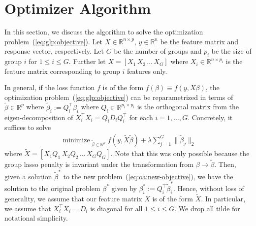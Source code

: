\documentclass[fontsize=11pt]{article}
\newcommand{\br}[1]{\left[#1\right]}
\newcommand{\R}{\mathbb{R}}
\newcommand{\norm}[1]{\|#1\|}
\DeclareMathOperator*{\minimize}{minimize\;}
\begin{document}
\section{Optimizer Algorithm}

In this section, we discuss the algorithm to solve the optimization problem~(\ref{eq:glp:objective}).
Let $X \in \R^{n\times p}$, $y\in \R^n$ be the feature matrix and response vector, respectively.
Let $G$ be the number of groups and $p_i$ be the size of group $i$ for $1\leq i\leq G$.
Further let $X = \br{X_1 \, X_2 \, \ldots \, X_G}$ where $X_i \in \R^{n \times p_i}$ is the feature matrix
corresponding to group $i$ features only.

In general, if the loss function $f$ is of the form $f(\beta) \equiv f(y, X\beta)$,
the optimization problem~(\ref{eq:glp:objective}) can be reparametrized
in terms of $\tilde{\beta} \in \R^p$ where $\tilde{\beta}_i := Q_i^\top \beta_i$
where $Q_i \in \R^{p_i \times p_i}$ is the orthogonal matrix from the eigen-decomposition of 
$X_i^\top X_i = Q_i D_i Q_i^\top$ for each $i=1,\ldots, G$.
Concretely, it suffices to solve
\begin{align}
    \minimize_{\tilde{\beta} \in \R^p}
    f(y, \tilde{X} \tilde{\beta})
    + \lambda \sum\limits_{j=1}^G \norm{\tilde{\beta}_j}_2
    \label{eq:oa:new-objective}
\end{align}
where $\tilde{X} = \br{X_1 Q_1 \, X_2 Q_2 \, \ldots \, X_G Q_G}$.
Note that this was only possible because the group lasso penalty is invariant under
the transformation from $\beta \to \tilde{\beta}$.
Then, given a solution $\tilde{\beta}^*$ to the new problem~(\ref{eq:oa:new-objective}),
we have the solution to the original problem $\beta^*$ given by
$\beta^*_i := Q_i^\top \tilde{\beta}_i^*$.
Hence, without loss of generality, we assume that 
our feature matrix $X$ is of the form $\tilde{X}$.
In particular, we assume that $X_i^\top X_i = D_i$ is diagonal for all $1\leq i\leq G$.
We drop all tilde for notational simplicity.
\end{document}
